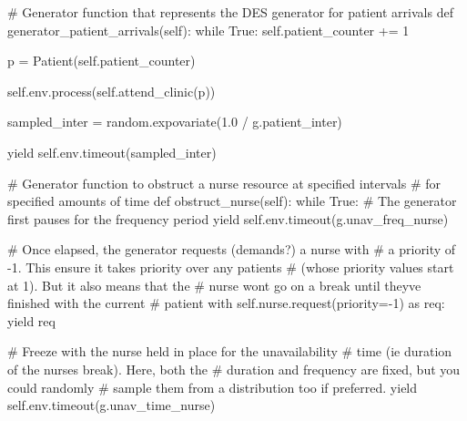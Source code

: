 \documentclass[
  letterpaper,
  DIV=11,
  numbers=noendperiod]{scrreprt}
\newenvironment{Shaded}{}{}
\newcommand{\CommentTok}[1]{\textcolor[rgb]{0.42,0.45,0.49}{#1}}
\newcommand{\ControlFlowTok}[1]{\textcolor[rgb]{0.84,0.23,0.29}{#1}}
\newcommand{\DecValTok}[1]{\textcolor[rgb]{0.00,0.36,0.77}{#1}}
\newcommand{\FloatTok}[1]{\textcolor[rgb]{0.00,0.36,0.77}{#1}}
\newcommand{\ImportTok}[1]{\textcolor[rgb]{0.01,0.18,0.38}{#1}}
\newcommand{\KeywordTok}[1]{\textcolor[rgb]{0.84,0.23,0.29}{#1}}
\newcommand{\NormalTok}[1]{\textcolor[rgb]{0.14,0.16,0.18}{#1}}
\newcommand{\OperatorTok}[1]{\textcolor[rgb]{0.14,0.16,0.18}{#1}}
\newcommand{\VariableTok}[1]{\textcolor[rgb]{0.89,0.38,0.04}{#1}}
\begin{document}
\begin{tcolorbox}
\begin{Shaded}
\begin{Highlighting}[]
    \CommentTok{\# Generator function that represents the DES generator for patient arrivals}
    \KeywordTok{def}\NormalTok{ generator\_patient\_arrivals(}\VariableTok{self}\NormalTok{):}
        \ControlFlowTok{while} \VariableTok{True}\NormalTok{:}
            \VariableTok{self}\NormalTok{.patient\_counter }\OperatorTok{+=} \DecValTok{1}

\NormalTok{            p }\OperatorTok{=}\NormalTok{ Patient(}\VariableTok{self}\NormalTok{.patient\_counter)}

            \VariableTok{self}\NormalTok{.env.process(}\VariableTok{self}\NormalTok{.attend\_clinic(p))}

\NormalTok{            sampled\_inter }\OperatorTok{=}\NormalTok{ random.expovariate(}\FloatTok{1.0} \OperatorTok{/}\NormalTok{ g.patient\_inter)}

            \ControlFlowTok{yield} \VariableTok{self}\NormalTok{.env.timeout(sampled\_inter)}

    \CommentTok{\# Generator function to obstruct a nurse resource at specified intervals}
    \CommentTok{\# for specified amounts of time}
    \KeywordTok{def}\NormalTok{ obstruct\_nurse(}\VariableTok{self}\NormalTok{):}
        \ControlFlowTok{while} \VariableTok{True}\NormalTok{:}
            \CommentTok{\# The generator first pauses for the frequency period}
            \ControlFlowTok{yield} \VariableTok{self}\NormalTok{.env.timeout(g.unav\_freq\_nurse)}

            \CommentTok{\# Once elapsed, the generator requests (demands?) a nurse with}
            \CommentTok{\# a priority of {-}1.  This ensure it takes priority over any patients}
            \CommentTok{\# (whose priority values start at 1).  But it also means that the}
            \CommentTok{\# nurse won\textquotesingle{}t go on a break until they\textquotesingle{}ve finished with the current}
            \CommentTok{\# patient}
            \ControlFlowTok{with} \VariableTok{self}\NormalTok{.nurse.request(priority}\OperatorTok{={-}}\DecValTok{1}\NormalTok{) }\ImportTok{as}\NormalTok{ req:}
                \ControlFlowTok{yield}\NormalTok{ req}

                \CommentTok{\# Freeze with the nurse held in place for the unavailability}
                \CommentTok{\# time (ie duration of the nurse\textquotesingle{}s break).  Here, both the}
                \CommentTok{\# duration and frequency are fixed, but you could randomly}
                \CommentTok{\# sample them from a distribution too if preferred.}
                \ControlFlowTok{yield} \VariableTok{self}\NormalTok{.env.timeout(g.unav\_time\_nurse)}


\end{Highlighting}
\end{Shaded}
\end{tcolorbox}
\end{document}

